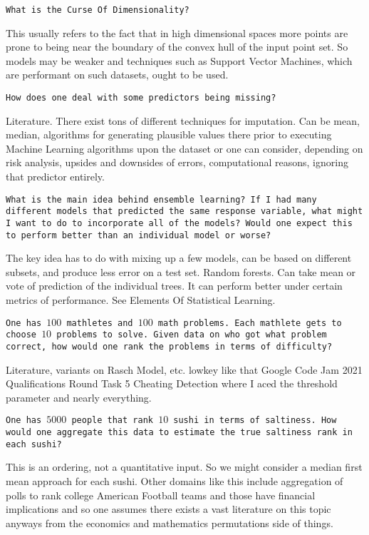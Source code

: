 \texttt{What is the Curse Of Dimensionality?}

This usually refers to the fact that in high dimensional spaces more points are prone to being near the boundary of the convex hull of the input point set. So models may be weaker and techniques such as Support Vector Machines, which are performant on such datasets, ought to be used.

\texttt{How does one deal with some predictors being missing?}

Literature. There exist tons of different techniques for imputation. Can be mean, median, algorithms for generating plausible values there prior to executing Machine Learning algorithms upon the dataset or one can consider, depending on risk analysis, upsides and downsides of errors, computational reasons, ignoring that predictor entirely.

\texttt{What is the main idea behind ensemble learning? If I had many different models that predicted the same response variable, what might I want to do to incorporate all of the models? Would one expect this to perform better than an individual model or worse?}

The key idea has to do with mixing up a few models, can be based on different subsets, and produce less error on a test set. Random forests. Can take mean or vote of prediction of the individual trees. It can perform better under certain metrics of performance. See Elements Of Statistical Learning.

\texttt{One has $100$ mathletes and $100$ math problems. Each mathlete gets to choose $10$ problems to solve. Given data on who got what problem correct, how would one rank the problems in terms of difficulty?}

Literature, variants on Rasch Model, etc. lowkey like that Google Code Jam 2021 Qualifications Round Task 5 Cheating Detection where I aced the threshold parameter and nearly everything.

\texttt{One has $5000$ people that rank $10$ sushi in terms of saltiness. How would one aggregate this data to estimate the true saltiness rank in each sushi?}

This is an ordering, not a quantitative input. So we might consider a median first mean approach for each sushi. Other domains like this include aggregation of polls to rank college American Football teams and those have financial implications and so one assumes there exists a vast literature on this topic anyways from the economics and mathematics permutations side of things.

